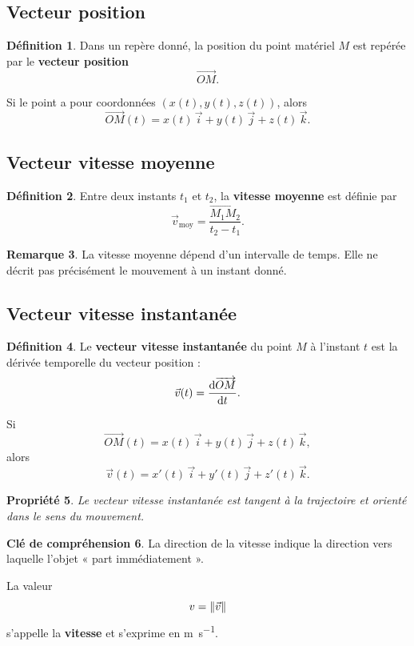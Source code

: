 \documentclass[11pt,a4paper]{article}
\theoremstyle{definition}
\newtheorem{definition}{Définition}[section]
\newtheorem{remarque}[definition]{Remarque}
\newtheorem{interpretation}[definition]{Clé de compréhension}
\theoremstyle{plain}
\newtheorem{propriete}[definition]{Propriété}
\theoremstyle{remark}
\newcommand{\OM}{\overrightarrow{OM}}
\begin{document}
\subsection{Vecteur position}

\begin{definition}
Dans un repère donné, la position du point matériel $M$ est repérée par le \textbf{vecteur position}
\[
\OM.
\]
\end{definition}

Si le point a pour coordonnées $(x(t),y(t),z(t))$, alors
\[
\OM(t)=x(t)\,\vec{i}+y(t)\,\vec{j}+z(t)\,\vec{k}.
\]

\subsection{Vecteur vitesse moyenne}

\begin{definition}
Entre deux instants $t_1$ et $t_2$, la \textbf{vitesse moyenne} est définie par
\[
\vec{v}_{\text{moy}}=\frac{\overrightarrow{M_1M_2}}{t_2-t_1}.
\]
\end{definition}

\begin{remarque}
La vitesse moyenne dépend d'un intervalle de temps. Elle ne décrit pas précisément le mouvement à un instant donné.
\end{remarque}

\subsection{Vecteur vitesse instantanée}

\begin{definition}
Le \textbf{vecteur vitesse instantanée} du point $M$ à l'instant $t$ est la dérivée temporelle du vecteur position :
\[
\vec{v}(t)=\dv{\OM}{t}.
\]
\end{definition}

Si
\[
\OM(t)=x(t)\,\vec{i}+y(t)\,\vec{j}+z(t)\,\vec{k},
\]
alors
\[
\vec{v}(t)=x'(t)\,\vec{i}+y'(t)\,\vec{j}+z'(t)\,\vec{k}.
\]

\begin{propriete}
Le vecteur vitesse instantanée est tangent à la trajectoire et orienté dans le sens du mouvement.
\end{propriete}

\begin{interpretation}
La direction de la vitesse indique la direction vers laquelle l'objet « part immédiatement ».  

La valeur
\[
v=\norm{\vec{v}}
\]
s'appelle la \textbf{vitesse} et s'exprime en \si{m.s^{-1}}.
\end{interpretation}
\end{document}
